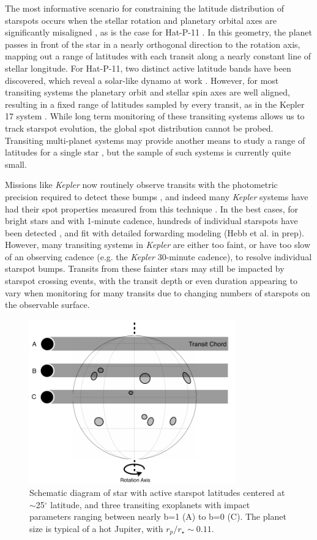 \documentclass[preprint2]{aastex62}
\newcommand{\Kepler}{\textsl{Kepler}\xspace}
\begin{document}
The most informative scenario for constraining the latitude distribution of starspots occurs when the stellar rotation and planetary orbital axes are significantly misaligned \citep{llama2012}, as is the case for Hat-P-11 \citep{sanchis-ojeda2011}. In this geometry, the planet passes in front of the star in a nearly orthogonal direction to the rotation axis, mapping out a range of latitudes with each transit along a nearly constant line of stellar longitude. For Hat-P-11, two distinct active latitude bands have been discovered, which reveal a solar-like dynamo at work \citep{morris2017}. However, for most transiting systems the planetary orbit and stellar spin axes are well aligned, resulting in a fixed range of latitudes sampled by every transit, as in the Kepler 17 system \citep{davenport_phd}. While long term monitoring of these transiting systems allows us to track starspot evolution, the global spot distribution cannot be probed. Transiting multi-planet systems may provide another means to study a range of latitudes for a single star \citep[e.g. Kepler 186; ][]{kepler186f}, but the sample of such systems is currently quite small.


Missions like \Kepler now routinely observe transits with the photometric precision required to detect these bumps \citep{borucki2010}, and indeed many \Kepler systems have had their spot properties measured from this technique \citep[e.g.][]{sanchis-ojeda2011, sanchis-ojeda2013}. In the best cases, for bright stars and with 1-minute cadence, hundreds of individual starspots have been detected \citep[e.g.][]{davenport_phd}, and fit with detailed forwarding modeling (Hebb et al. in prep). However, many transiting systems in \Kepler are either too faint, or have too slow of an observing cadence (e.g. the \Kepler 30-minute cadence), to resolve individual starspot bumps. Transits from these fainter stars may still be impacted by starspot crossing events, with the transit depth or even duration appearing to vary when monitoring for many transits due to changing numbers of starspots on the observable surface.



\begin{figure}[!t]
\centering
\includegraphics[width=3.5in]{diagram1}
\caption{
Schematic diagram of star with active starspot latitudes centered at $\sim$25$^\circ$ latitude, and three transiting exoplanets with impact parameters ranging between nearly b=1 (A) to  b=0 (C). The planet size is typical of a hot Jupiter, with $r_p/r_\star\sim0.11$.
}
\label{fig:diagram1}
\end{figure}
\end{document}
